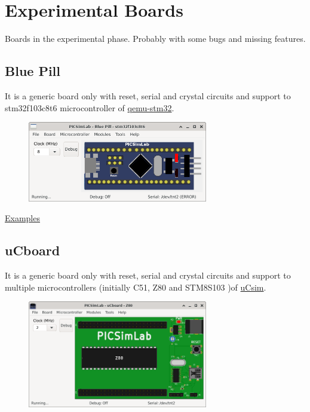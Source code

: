 
\chapter{Experimental Boards}\hypertarget{def:eboards}{}

Boards in the experimental phase. Probably with some bugs and missing features. 

\section{Blue Pill}

It is a generic board only with reset, serial and crystal circuits and support to stm32f103c8t6 microcontroller of 
\href{https://beckus.github.io/qemu_stm32/}{qemu-stm32}.

\begin{figure}[H]
\center
\includegraphics[width=0.7\textwidth]{img/Blue_Pill.png} 
\end{figure} 

\href{https://lcgamboa.github.io/picsimlab_examples/examples/examples_index_exp.html\#board_Blue_Pill}{Examples}

\section{uCboard}

It is a generic board only with reset, serial and crystal circuits and support to multiple microcontrollers 
(initially C51, Z80 and STM8S103 )of \href{http://mazsola.iit.uni-miskolc.hu/\%7edrdani/embedded/ucsim/}{uCsim}.

\begin{figure}[H]
\center
\includegraphics[width=0.7\textwidth]{img/uCboard.png} 
\end{figure} 

